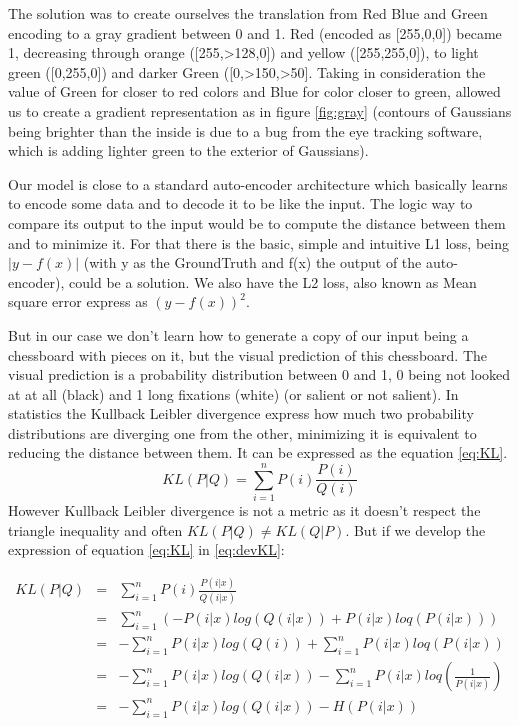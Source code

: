 The solution was to create ourselves the translation from Red Blue and Green encoding to a gray gradient between 0 and 1. Red (encoded as [255,0,0]) became 1, decreasing through orange  ([255,>128,0]) and yellow ([255,255,0]), to light green ([0,255,0]) and darker Green ([0,>150,>50]. Taking in consideration the value of Green for closer to red colors and Blue for color closer to green, allowed us to create a gradient representation as in figure \ref{fig:gray} (contours of Gaussians being brighter than the inside is due to a bug from the eye tracking software, which is adding lighter green to the exterior of  Gaussians).

Our model is close to a standard auto-encoder architecture which basically learns to encode some data and to decode it to be like the input. The logic way to compare its output to the input would be to compute the distance between them and to minimize it. 
For that there is the basic, simple and intuitive L1 loss, being $|y - f(x)|$ (with y as the GroundTruth and f(x) the output of the auto-encoder), could be a solution. We also have the L2 loss, also known as Mean square error express as $ (y- f(x))^2$.

But in our case we don't learn how to generate a copy of our input being a chessboard with pieces on it, but the visual prediction of this chessboard. The visual prediction is a probability distribution between 0 and 1, 0 being not looked at at all (black) and 1 long fixations (white) (or salient or not salient).
In statistics the Kullback Leibler divergence \cite{10.2307/2236703} express how much two probability distributions are diverging one from the other, minimizing it is equivalent to reducing the distance between them. 
It can be expressed as the equation \ref{eq:KL}.
\begin{equation}
    \label{eq:KL}
    KL(P|Q) = \sum\limits_{i=1}^n P(i) \frac{P(i)}{Q(i)}
\end{equation}
However Kullback Leibler divergence is not a metric as it doesn't respect the triangle inequality and often $KL(P|Q) \neq KL(Q|P)$. But if we develop the expression of equation \ref{eq:KL} in \ref{eq:devKL}:

\begin{align}
\label{eq:devKL}
KL(P|Q) & = & \sum\limits_{i=1}^n P(i) \frac{P(i|x)}{Q(i|x)}\\  
& = & \sum\limits_{i=1}^n ( - P(i|x) log(Q(i|x))  + P(i|x) loq(P(i|x)))\\
& = & - \sum\limits_{i=1}^n   P(i|x) log(Q(i))  + \sum\limits_{i=1}^n P(i|x) loq(P(i|x))\\
& = &  -\sum\limits_{i=1}^n  P(i|x) log(Q(i|x)) - \sum\limits_{i=1}^n P(i|x) loq(\frac{1}{P(i|x)})\\
&  = & -\sum\limits_{i=1}^n   P(i|x) log(Q(i|x)) - H(P(i|x))
\end{align}


